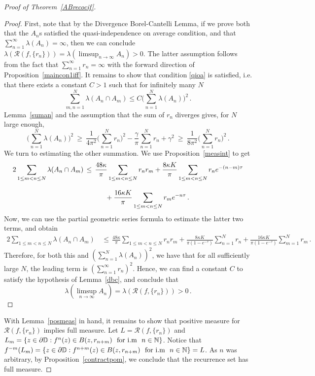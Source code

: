 \documentclass[11pt,reqno]{amsart}
\newcommand{\N}{{\Bbb N}}
\newcommand{\D}{{\Bbb D}}
\newcommand{\0}{\mathbf{0}}
\theoremstyle{remark}
\numberwithin{equation}{section}
\theoremstyle{remark}
\numberwithin{equation}{section}
\newcommand{\cR}{\mathcal{R}}
\begin{document}
\begin{proof}[Proof of Theorem~\ref{ABrecocif}]
    \begin{proof}
    First, note that by the Divergence Borel-Cantelli Lemma, if we prove both that the $A_n$s satisfied the quasi-independence on average condition, and that $\sum_{n=1}^\infty \lambda(A_n)=\infty$, then we can conclude $\lambda(\cR(f,\{r_n\}))=\lambda(\limsup_{n \to \infty} A_n)>0$. The latter assumption follows from the fact that $\sum_{n=1}^\infty r_n=\infty$ with the forward direction of Proposition~\ref{maincon1iff}. It remains to show that condition \eqref{qioa} is satisfied,  i.e. that there exists a constant $C>1$ such that for infinitely many $N$
    $$
    \sum_{m,n=1}^N\lambda(A_n \cap A_m) \leq C\Big(\sum_{n=1}^N \lambda(A_n)\Big)^2 \, .
    $$
 Lemma~\ref{suman} and the assumption that the sum of $r_n$ diverges gives, for $N$ large enough,
$$
\Big(\sum_{n=1}^N \lambda(A_n)\Big)^2 \: \geq \: \frac{1}{4\pi^2}\Big(\sum_{n=1}^N r_n\Big)^2-\frac{\gamma}{\pi}\sum_{n=1}^N r_n+\gamma^2 \: \geq \: \frac{1}{8\pi^2}\Big(\sum_{n=1}^N r_n\Big)^2 \, .
$$
We turn to estimating the other summation. We use Proposition~\ref{measint} to get
\begin{align*}
     2\sum_{1 \leq m<n\leq N}\lambda(A_n \cap A_m) \, &\leq \, \frac{48\kappa}{\pi}\sum_{1 \leq m<n \leq N}r_n r_m + \frac{8\kappa K}{\pi} \sum_{1 \leq m<n \leq N} r_ne^{-(n-m)\tau} \\[2ex]& \hskip30pt + \frac{16\kappa K}{\pi}\sum_{1 \leq m<n \leq N}r_me^{-n \tau} \, .
\end{align*}
Now, we  can use the partial geometric series formula to estimate the latter two terms, and obtain
\begin{align*}
     2\sum_{1 \leq m<n\leq N}\lambda(A_n \cap A_m) \, &\leq \, \frac{48\kappa}{\pi}\sum_{1 \leq m<n \leq N}r_n r_m + \frac{8\kappa K}{\pi(1-e^{-\tau})} \sum_{n=1}^N r_n  + \frac{16\kappa K}{\pi(1-e^{-\tau})}\sum_{m=1}^Nr_m\, .
\end{align*}
 Therefore, for both this and  $\left( \sum_{n=1}^N \lambda(A_n) \right)^2 $, we have that for all sufficiently large $N$, the leading term is $ (\sum_{n=1}^\infty r_n)^2 $. Hence, we can find a constant $C$ to satisfy the hypothesis of Lemma~\ref{dbc}, and conclude that 
$$
\lambda(\limsup\limits_{n \to \infty} A_n)= \lambda(\mathcal{R}(f,\{r_n\}))>0 \, .
$$ 
\end{proof}
With Lemma~\ref{posmeas} in hand, it remains to show that positive measure for $\mathcal{R}(f,\{r_n\})$ implies full measure.  Let $L=\mathcal{R}(f,\{r_n\})$ and $L_m= \{z \in \partial \D: f^n(z) \in B(z,r_{n+m}) \text{ \ for i.m \ } n \in \N\}$.
Notice that $f^{-m}(L_m)= \{z \in \partial \D: f^{n+m}(z) \in B(z,r_{n+m}) \text{ \ for i.m \ } n \in \N\} = L$. As $n$ was arbitrary, by Proposition~\ref{contractpom}, we conclude that the recurrence set has full measure. 
\end{proof}
\end{document}
